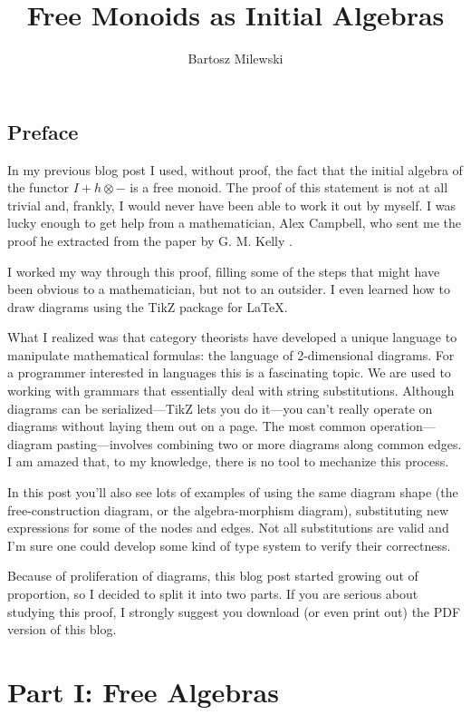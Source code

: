 \documentclass[letterpaper, 10 pt, conference]{ieeeconf}
\title{\LARGE \bf
Free Monoids as Initial Algebras
}
\author{Bartosz Milewski}
\begin{document}
\maketitle
\thispagestyle{empty}
\pagestyle{empty}

\subsection{Preface}

In my previous blog post I used, without proof, the fact that the initial algebra of the functor $I + h \otimes -$ is a free monoid. The proof of this statement is not at all trivial and, frankly, I would never have been able to work it out by myself. I was lucky enough to get help from a mathematician, Alex Campbell, who sent me the proof he extracted from the paper by G. M. Kelly \cite{Kelly}. 

I worked my way through this proof, filling some of the steps that might have been obvious to a mathematician, but not to an outsider. I even learned how to draw diagrams using the TikZ package for \LaTeX. 

What I realized was that category theorists have developed a unique language to manipulate mathematical formulas: the language of 2-dimensional diagrams. For a programmer interested in languages this is a fascinating topic. We are used to working with grammars that essentially deal with string substitutions. Although diagrams can be serialized---TikZ lets you do it---you can't really operate on diagrams without laying them out on a page. The most common operation---diagram pasting---involves combining two or more diagrams along common edges. I am amazed that, to my knowledge, there is no tool to mechanize this process. 

In this post you'll also see lots of examples of using the same diagram shape (the free-construction diagram, or the algebra-morphism diagram), substituting new expressions for some of the nodes and edges. Not all substitutions are valid and I'm sure one could develop some kind of type system to verify their correctness. 

Because of proliferation of diagrams, this blog post started growing out of proportion, so I decided to split it into two parts. If you are serious about studying this proof, I strongly suggest you download (or even print out) the PDF version of this blog.

\section{Part I: Free Algebras}
\end{document}
